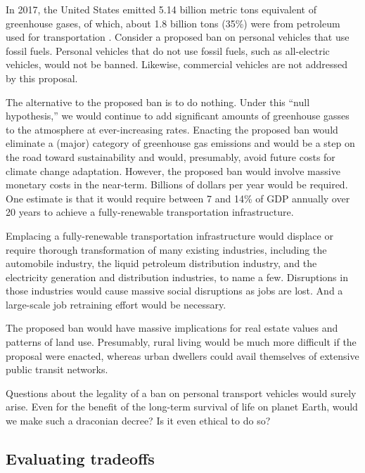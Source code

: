 \documentclass[12pt]{article}
\begin{document}
In 2017, the United States emitted 5.14 billion metric tons equivalent of greenhouse gases, 
of which, about 1.8 billion tons (35\%) were from petroleum used for transportation \cite{EIA2017}.
Consider a proposed ban on personal vehicles that use fossil fuels.
Personal vehicles that do not use fossil fuels, such as all-electric vehicles, would not be banned. 
Likewise, commercial vehicles are not addressed by this proposal. %

The alternative to the proposed ban is to do nothing. 
Under this ``null hypothesis,'' 
we would continue to add significant amounts of greenhouse gasses to the atmosphere 
at ever-increasing rates.
Enacting the proposed ban would eliminate a (major) category 
of greenhouse gas emissions and 
would be a step on the road toward sustainability
and would, presumably, avoid future costs for climate change adaptation.
However, the proposed ban would involve massive monetary costs in the near-term. 
Billions of dollars per year would be required. 
One estimate is that it would require between 7 and 14\% of GDP annually 
over 20 years to achieve a fully-renewable transportation infrastructure.

Emplacing a fully-renewable transportation infrastructure 
would displace or require thorough transformation of many existing industries, including 
the automobile industry, 
the liquid petroleum distribution industry, and
the electricity generation and distribution industries,
to name a few.
Disruptions in those industries 
would cause massive social disruptions 
as jobs are lost.
And a large-scale job retraining effort would be necessary.

The proposed ban would have massive implications for real estate values 
and patterns of land use. 
Presumably, rural living would be much more difficult if the proposal were enacted,
whereas urban dwellers could avail themselves of extensive public transit networks.

Questions about the legality of a ban on personal transport vehicles would surely arise.  
Even for the benefit of the long-term survival of life on planet Earth,
would we make such a draconian decree? 
Is it even ethical to do so?


\subsection{Evaluating tradeoffs}
\label{sec:evaluating_tradeoffs}
\end{document}
